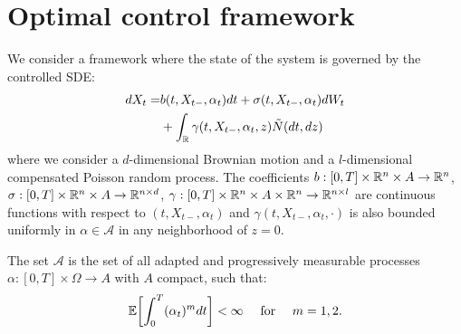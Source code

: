 \section{Optimal control framework}\label{Optimal_control_framework}

We consider a framework where the state of the system is governed by the controlled SDE:
\begin{align}\label{controlled_SDE}
 dX_t =& b(t,X_{t-},\alpha_t) dt + \sigma (t,X_{t-},\alpha_t) dW_t \\ \nonumber
      &+ \int_{\mathbb{R}} \gamma(t,X_{t-},\alpha_t,z) \tilde N(dt,dz)
\end{align}
where we consider a $d$-dimensional Brownian motion and a $l$-dimensional compensated Poisson random process.
The coefficients $b: [0,T]\times \mathbb{R}^n \times A \to \mathbb{R}^n$, $\sigma: [0,T]\times \mathbb{R}^n \times A \to \mathbb{R}^{n\times d}$, 
$\gamma: [0,T]\times \mathbb{R}^n \times A \times \mathbb{R}^n \to \mathbb{R}^{n\times l}$ are continuous functions with respect to $(t,X_{t-},\alpha_t)$ and $\gamma(t,X_{t-},\alpha_t,\cdot)$ is also bounded
uniformly in $\alpha \in \mathcal{A}$ in any neighborhood of $z=0$. 

The set $\mathcal{A}$ is the set of all adapted and progressively measurable processes $\alpha: [0,T]\times \Omega \to  A$ with $A$ compact, such that:
$$ \mathbb{E} \biggl[ \int_0^T (\alpha_t)^m dt \biggr] < \infty \quad \mbox{ for } \quad m=1,2. $$

